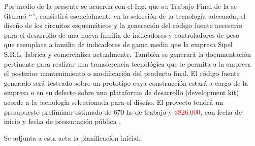 \documentclass[11pt]{charter}
\begin{document}
\vspace{2cm}

Por medio de la presente se acuerda con el Ing. \authorname\hspace{1px} que su Trabajo Final de la \degreename\hspace{1px} se titulará ``\ttitle'', consistirá esencialmente en la selección de la tecnología adecuada, el diseño de los circuitos esquemáticos y la generación del código fuente necesario para el desarrollo de una nueva familia de indicadores y controladores de peso que reemplace a familia de indicadores de gama media que la empresa Sipel S.R.L. fabrica y comercializa actualmente. También se generará la documentación pertinente para realizar una transferencia tecnológica que le permita a la empresa el posterior mantenimiento o modificación del producto final. El código fuente generado será testeado sobre un prototipo cuya construcción estará a cargo de la empresa o en su defecto sobre una plataforma de desarrollo (development kit) acorde a la tecnología seleccionada para el diseño. El proyecto tendrá un presupuesto preliminar estimado de 670 hs de trabajo y \textcolor{red}{\$826.000}, con fecha de inicio \fechaInicioName\hspace{1px} y fecha de presentación pública \fechaFinalName.

Se adjunta a esta acta la planificación inicial.

\vfill
\end{document}
